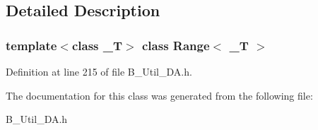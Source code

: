 \subsection{Detailed Description}
\subsubsection*{template$<$class \_\-T$>$ class Range$<$ \_\-T $>$}



Definition at line 215 of file B\_\-Util\_\-DA.h.

The documentation for this class was generated from the following file:\begin{DoxyCompactItemize}
\item 
B\_\-Util\_\-DA.h\end{DoxyCompactItemize}
